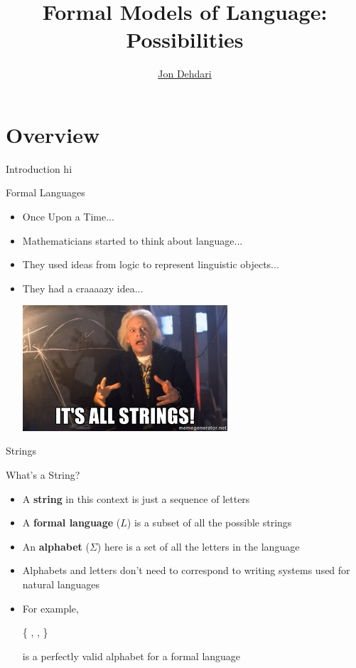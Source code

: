 \documentclass{beamer}
\begin{document}
\title{Formal Models of Language: \\[1.0em] \small{Possibilities}}
\author{\href{http://jon.dehdari.org}{Jon Dehdari}}
\frame{\titlepage}

\section{Overview}
\begin{frame}{Introduction}
hi
\end{frame}

\begin{frame}{Formal Languages}
\begin{block}{}
\begin{itemize}
	\item Once Upon a Time...
	\pause
	\item Mathematicians started to think about language...
	\pause
	\item They used ideas from logic to represent linguistic objects...
	\pause
	\item They had a craaaazy idea... \\
	\pause
	\begin{center}
	\includegraphics[width=0.6\textwidth]{images/doc_brown_strings.jpg}
	\end{center}
\end{itemize}
\end{block}
\end{frame}


\begin{frame}{Strings}
\begin{block}{What's a String?}
\begin{itemize}
	\item A \textbf{string} in this context is just a sequence of letters
	\pause
	\item A \textbf{formal language} ($L$) is a subset of all the possible strings
	\pause
	\item An \textbf{alphabet} ($\Sigma$) here is a set of all the letters in the language
	\pause
	\item Alphabets and letters don't need to correspond to writing systems used for natural languages
	\pause
	\item For example,\\
	\begin{center}
	{\Large \{ \Smiley[][cyan], \Springtree, \Snowman \}}\\
	\end{center}
	is a perfectly valid alphabet for a formal language
\end{itemize}
\end{block}
\end{frame}
\end{document}
